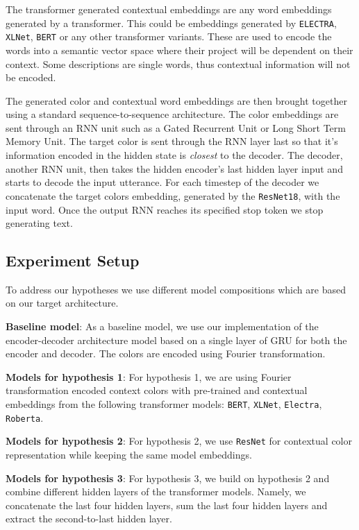 \par
The transformer generated contextual embeddings are any word embeddings generated by a transformer. This could be embeddings generated by \texttt{ELECTRA}, \texttt{XLNet}, \texttt{BERT} or any other transformer variants. These are used to encode the words into a semantic vector space where their project will be dependent on their context. Some descriptions are single words, thus contextual information will not be encoded.

\par
The generated color and contextual word embeddings are then brought together using a standard sequence-to-sequence architecture. The color embeddings are sent through an RNN unit such as a Gated Recurrent Unit or Long Short Term Memory Unit. The target color is sent through the RNN layer last so that it’s information encoded in the hidden state is \emph{closest} to the decoder. The decoder, another RNN unit,  then takes the hidden encoder's last hidden layer input and starts to decode the input utterance. For each timestep of the decoder we concatenate the target colors embedding, generated by the \texttt{ResNet18}, with the input word. Once the output RNN reaches its specified stop token we stop generating text.

\subsection{Experiment Setup}
To address our hypotheses we use different model compositions which are based on our target architecture.

\textbf{Baseline model}:
As a baseline model, we use our implementation of the encoder-decoder architecture model based on a single layer of GRU for both the encoder and decoder. The colors are encoded using Fourier transformation.

\textbf{Models for hypothesis 1}:
For hypothesis 1, we are using Fourier transformation encoded context colors with pre-trained and contextual embeddings from the following transformer models: \texttt{BERT}, \texttt{XLNet}, \texttt{Electra}, \texttt{Roberta}.

\textbf{Models for hypothesis 2}:
For hypothesis 2, we use \texttt{ResNet} for contextual color representation while keeping the same model embeddings.

\textbf{Models for hypothesis 3}:
For hypothesis 3, we build on hypothesis 2 and combine different hidden layers of the transformer models. Namely, we concatenate the last four hidden layers, sum the last four hidden layers and extract the second-to-last hidden layer.